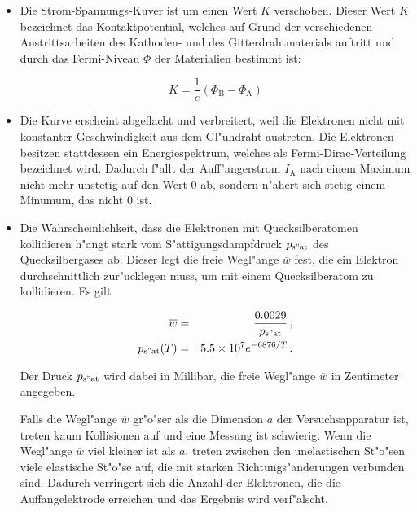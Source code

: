 		\begin{itemize}
			\item Die Strom-Spannungs-Kuver ist um einen Wert $K$ verschoben.
			Dieser Wert $K$ bezeichnet das Kontaktpotential, welches auf Grund der verschiedenen Austrittsarbeiten des Kathoden- und des Gitterdrahtmaterials auftritt und durch das Fermi-Niveau $\Phi$ der Materialien bestimmt ist:

			\begin{equation*}
				K = \frac{1}{e} (\Phi_\mathrm{B} - \Phi_\mathrm{A}) \label{eqn:k}
			\end{equation*}

			\item Die Kurve erscheint abgeflacht und verbreitert, weil die Elektronen nicht mit konstanter Geschwindigkeit aus dem Gl"uhdraht austreten.
			Die Elektronen besitzen stattdessen ein Energiespektrum, welches als Fermi-Dirac-Verteilung bezeichnet wird.
			Dadurch f"allt der Auff"angerstrom $I_\mathrm{A}$ nach einem Maximum nicht mehr unstetig auf den Wert 0 ab, sondern n"ahert sich stetig einem Minumum, das nicht 0 ist.

			\item Die Wahrscheinlichkeit, dass die Elektronen mit Quecksilberatomen kollidieren h"angt stark vom S"attigungsdampfdruck $p_\mathrm{s"at}$ des Quecksilbergases ab.
			Dieser legt die freie Wegl"ange $\overline{w}$ fest, die ein Elektron durchschnittlich zur"ucklegen muss, um mit einem Quecksilberatom zu kollidieren.
			Es gilt

			\begin{eqnarray}
				\label{eqn:w} \overline{w} & = & \frac{\SI{.0029}{}}{p_\mathrm{s"at}} \,, \\
				\label{eqn:p} p_\mathrm{s"at}(T) & = & \SI{5.5e7}{} e^{\SI{-6876}{} / T} \,.
			\end{eqnarray}

			Der Druck $p_\mathrm{s"at}$ wird dabei in Millibar, die freie Wegl"ange $\overline{w}$ in Zentimeter angegeben.

			Falls die Wegl"ange $\overline{w}$ gr"o"ser als die Dimension $a$ der Versuchsapparatur ist, treten kaum Kollisionen auf und eine Messung ist schwierig.
			Wenn die Wegl"ange $\overline{w}$ viel kleiner ist als $a$, treten zwischen den unelastischen St"o"sen viele elastische St"o"se auf, die mit starken Richtungs"anderungen verbunden sind.
			Dadurch verringert sich die Anzahl der Elektronen, die die Auffangelektrode erreichen und das Ergebnis wird verf"alscht.
		\end{itemize}

